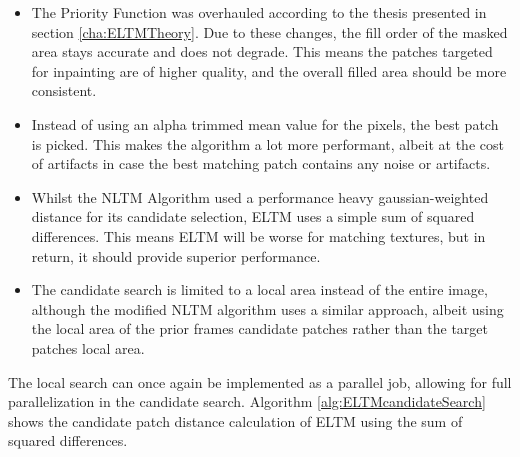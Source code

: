 \begin{itemize}
    \item The Priority Function was overhauled according to the thesis presented in section \ref{cha:ELTMTheory}. Due to these changes, the fill order of the masked area stays accurate and does not degrade. This means the patches targeted for inpainting are of higher quality, and the overall filled area should be more consistent.
    \item Instead of using an alpha trimmed mean value for the pixels, the best patch is picked. This makes the algorithm a lot more performant, albeit at the cost of artifacts in case the best matching patch contains any noise or artifacts.
    \item Whilst the NLTM Algorithm used a performance heavy gaussian-weighted distance for its candidate selection, ELTM uses a simple sum of squared differences. This means ELTM will be worse for matching textures, but in return, it should provide superior performance.
    \item The candidate search is limited to a local area instead of the entire image, although the modified NLTM algorithm uses a similar approach, albeit using the local area of the prior frames candidate patches rather than the target patches local area.
\end{itemize}

The local search can once again be implemented as a parallel job, allowing for full parallelization in the candidate search. Algorithm \ref{alg:ELTMcandidateSearch} shows the candidate patch distance calculation of ELTM using the sum of squared differences.


